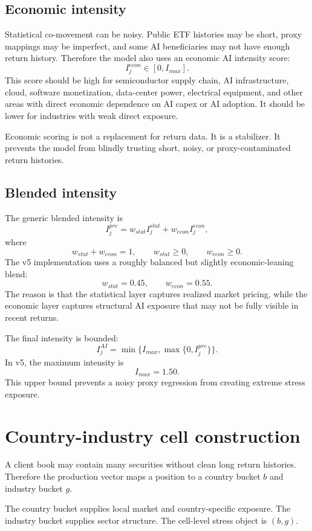 \documentclass[11pt]{article}
\begin{document}
\subsection{Economic intensity}

Statistical co-movement can be noisy. Public ETF histories may be short, proxy mappings may be imperfect, and some AI beneficiaries may not have enough return history. Therefore the model also uses an economic AI intensity score:
\[
I_j^{econ}\in[0,I_{max}].
\]
This score should be high for semiconductor supply chain, AI infrastructure, cloud, software monetization, data-center power, electrical equipment, and other areas with direct economic dependence on AI capex or AI adoption. It should be lower for industries with weak direct exposure.

Economic scoring is not a replacement for return data. It is a stabilizer. It prevents the model from blindly trusting short, noisy, or proxy-contaminated return histories.

\subsection{Blended intensity}

The generic blended intensity is
\[
I_j^{pre}=w_{stat}I_j^{stat}+w_{econ}I_j^{econ},
\]
where
\[
w_{stat}+w_{econ}=1,
\qquad w_{stat}\geq 0,
\qquad w_{econ}\geq 0.
\]
The v5 implementation uses a roughly balanced but slightly economic-leaning blend:
\[
w_{stat}=0.45,
\qquad w_{econ}=0.55.
\]
The reason is that the statistical layer captures realized market pricing, while the economic layer captures structural AI exposure that may not be fully visible in recent returns.

The final intensity is bounded:
\[
I_j^{AI}=\min\{I_{max},\max\{0,I_j^{pre}\}\}.
\]
In v5, the maximum intensity is
\[
I_{max}=1.50.
\]
This upper bound prevents a noisy proxy regression from creating extreme stress exposure.

\section{Country-industry cell construction}

A client book may contain many securities without clean long return histories. Therefore the production vector maps a position to a country bucket $b$ and industry bucket $g$.

The country bucket supplies local market and country-specific exposure. The industry bucket supplies sector structure. The cell-level stress object is $(b,g)$.
\end{document}
